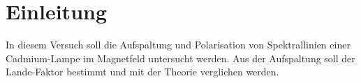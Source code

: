 \section{Einleitung}

In diesem Versuch soll die Aufspaltung und Polarisation von Spektrallinien einer Cadmium-Lampe im Magnetfeld untersucht werden.
Aus der Aufspaltung soll der Lande-Faktor bestimmt und mit der Theorie verglichen werden.
